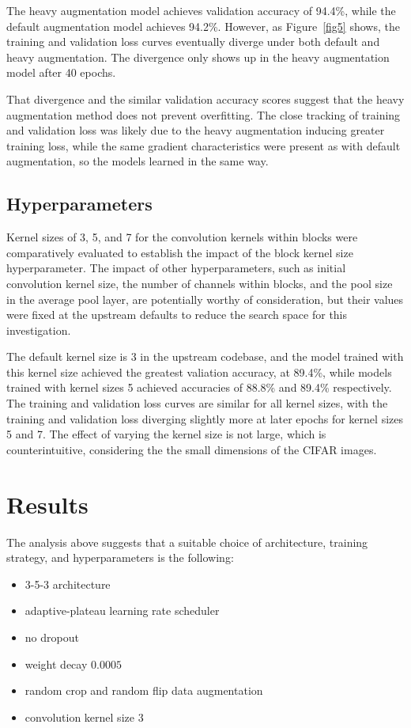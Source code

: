 \documentclass[letterpaper]{article} %
\begin{document}
The heavy augmentation model achieves validation accuracy of 94.4\%, while the default
augmentation model achieves 94.2\%.
However, as Figure~\ref{fig5} shows, the training and validation loss curves eventually
diverge under both default and heavy augmentation.
The divergence only shows up in the heavy augmentation model after 40 epochs.

That divergence and the similar validation accuracy scores suggest that the heavy augmentation
method does not prevent overfitting.
The close tracking of training and validation loss was likely due to the heavy
augmentation inducing greater training loss,
while the same gradient characteristics were present as with default augmentation, so the models learned
in the same way.

\subsection{Hyperparameters}

Kernel sizes of 3, 5, and 7 for the convolution kernels within blocks were comparatively evaluated to establish the impact of the
block kernel size hyperparameter.
The impact of other hyperparameters, such as initial convolution kernel size,
the number of channels within blocks, and the pool size in the average pool
layer, are potentially worthy of consideration, but their values were fixed at the upstream defaults to reduce the
search space for this investigation.

The default kernel size is 3 in the upstream codebase, and the model trained with this kernel size achieved the
greatest valiation accuracy, at 89.4\%, while models trained with kernel sizes 5 achieved accuracies
of 88.8\% and 89.4\% respectively.
The training and validation loss curves are similar for all kernel sizes, with the training and validation
loss diverging slightly more at later epochs for kernel sizes 5 and 7.
The effect of varying the kernel size is not large, which is counterintuitive, considering the
the small dimensions of the CIFAR images.

\section{Results}

The analysis above suggests that a suitable choice of architecture, training strategy, and hyperparameters
is the following:

\begin{itemize}
    \item 3-5-3 architecture
    \item adaptive-plateau learning rate scheduler
    \item no dropout
    \item weight decay $ 0.0005 $
    \item random crop and random flip data augmentation
    \item convolution kernel size $ 3 $
\end{itemize}
\end{document}
